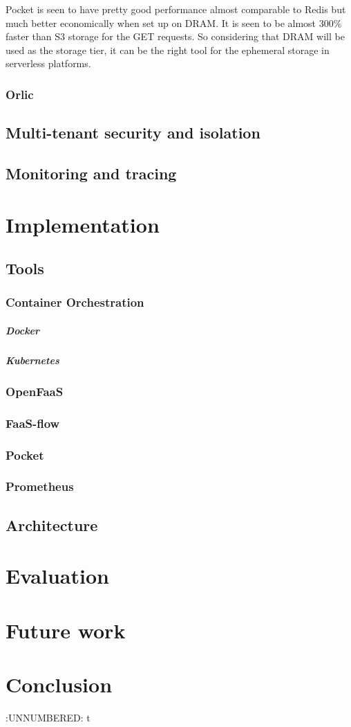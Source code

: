 \documentclass[12pt,titlepage]{article}
\begin{document}
Pocket is seen to have pretty good performance almost comparable to Redis but
much better economically when set up on DRAM. It is seen to be almost 300\%
faster than S3 storage for the GET requests. So considering that DRAM will be
used as the storage tier, it can be the right tool for the ephemeral storage in
serverless platforms. 





\subsubsection{Orlic}
\label{sec:org1572fa9}
\subsection{Multi-tenant security and isolation}
\label{sec:orgcc447fe}
\subsection{Monitoring and tracing}
\label{sec:orgd42d8ea}

\section{Implementation}
\label{sec:org1d75e47}
\subsection{Tools}
\label{sec:org5710ac8}
\subsubsection{Container Orchestration}
\label{sec:orge149eb2}
\subparagraph{Docker}
\label{sec:org3a2abea}
\subparagraph{Kubernetes}
\label{sec:org090a1fb}
\subsubsection{OpenFaaS}
\label{sec:org1432b6d}
\subsubsection{FaaS-flow}
\label{sec:orgcb6c940}
\subsubsection{Pocket}
\label{sec:org59c86c8}
\subsubsection{Prometheus}
\label{sec:org88803cb}
\subsection{Architecture}
\label{sec:org48b1aac}
\section{Evaluation}
\label{sec:org037b2aa}
\section{Future work}
\label{sec:orgcde8b56}
\section{Conclusion}
\label{sec:orgfb44428}


:UNNUMBERED: t
\end{document}
